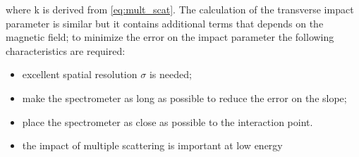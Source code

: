 where k is derived from \ref{eq:mult_scat}.
The calculation of the transverse impact parameter is similar but it contains additional terms that depends on the magnetic field; to minimize the error on the impact parameter the following characteristics are required:
\begin{itemize}
\item excellent spatial resolution $\sigma$ is needed;
\item make the spectrometer as long as possible to reduce the error on the slope;
\item place the spectrometer as close as possible to the interaction point.
\item the impact of multiple scattering is important at low energy
\end{itemize}



